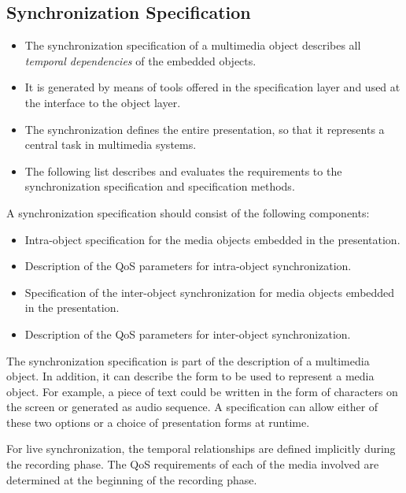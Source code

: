 \subsection{Synchronization Specification}
\begin{multicols}{2}
	\begin{itemize}
		\item The synchronization specification of a multimedia object describes all \textit{temporal dependencies} of the embedded objects. 
		\item It is generated by means of tools offered in the specification layer and used at the interface to the object layer. 
		\item The synchronization defines the entire presentation, so that it represents a central task in multimedia systems.
		\item The following list describes and evaluates the requirements to the synchronization specification and specification methods.
	\end{itemize}
\end{multicols}


A synchronization specification should consist of the following components:

\begin{multicols}{2}
	\begin{itemize}
		\item Intra-object specification for the media objects embedded in the presentation.
		\item Description of the QoS parameters for intra-object synchronization.
		\item Specification of the inter-object synchronization for media objects embedded in the presentation.
		\item Description of the QoS parameters for inter-object synchronization.
	\end{itemize}
\end{multicols}


The synchronization specification is part of the description of a multimedia object. In addition, it can describe the form to be used to represent a media object. For example, a piece of text could be written in the form of characters on the screen or generated as audio sequence. A specification can allow either of these two options or a choice of presentation forms at runtime.

For live synchronization, the temporal relationships are defined implicitly during the recording phase. The QoS requirements of each of the media involved are determined at the beginning of the recording phase.

